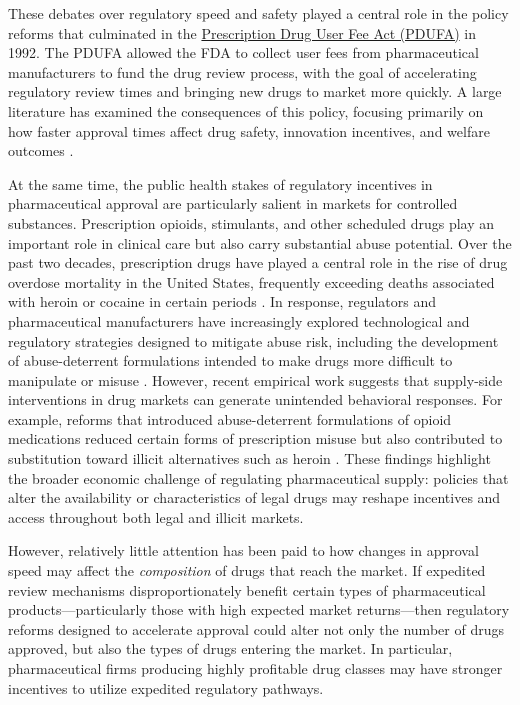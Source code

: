 These debates over regulatory speed and safety played a central role in the policy reforms that culminated in the \href{https://www.fda.gov/industry/fda-user-fee-programs/prescription-drug-user-fee-amendments}{Prescription Drug User Fee Act (PDUFA)} in 1992. The PDUFA allowed the FDA to collect user fees from pharmaceutical manufacturers to fund the drug review process, with the goal of accelerating regulatory review times and bringing new drugs to market more quickly. A large literature has examined the consequences of this policy, focusing primarily on how faster approval times affect drug safety, innovation incentives, and welfare outcomes \parencite{olsonRiskWeBear2008}.

At the same time, the public health stakes of regulatory incentives in pharmaceutical approval are particularly salient in markets for controlled substances. Prescription opioids, stimulants, and other scheduled drugs play an important role in clinical care but also carry substantial abuse potential. Over the past two decades, prescription drugs have played a central role in the rise of drug overdose mortality in the United States, frequently exceeding deaths associated with heroin or cocaine in certain periods \parencite{hedegaardDrugOverdoseDeaths2020a}. In response, regulators and pharmaceutical manufacturers have increasingly explored technological and regulatory strategies designed to mitigate abuse risk, including the development of abuse-deterrent formulations intended to make drugs more difficult to manipulate or misuse \parencite{colemanReducingAbusePotential2010}. However, recent empirical work suggests that supply-side interventions in drug markets can generate unintended behavioral responses. For example, reforms that introduced abuse-deterrent formulations of opioid medications reduced certain forms of prescription misuse but also contributed to substitution toward illicit alternatives such as heroin \parencite{alpertSupplySideDrugPolicy2018a}. These findings highlight the broader economic challenge of regulating pharmaceutical supply: policies that alter the availability or characteristics of legal drugs may reshape incentives and access throughout both legal and illicit markets.

However, relatively little attention has been paid to how changes in approval speed may affect the
\textit{composition} of drugs that reach the market. If expedited review mechanisms disproportionately benefit certain types of pharmaceutical products—particularly those with high expected market returns—then regulatory reforms designed to accelerate approval could alter not only the number of drugs approved, but also the types of drugs entering the market. In particular, pharmaceutical firms producing highly profitable drug classes may have stronger incentives to utilize expedited regulatory pathways.

